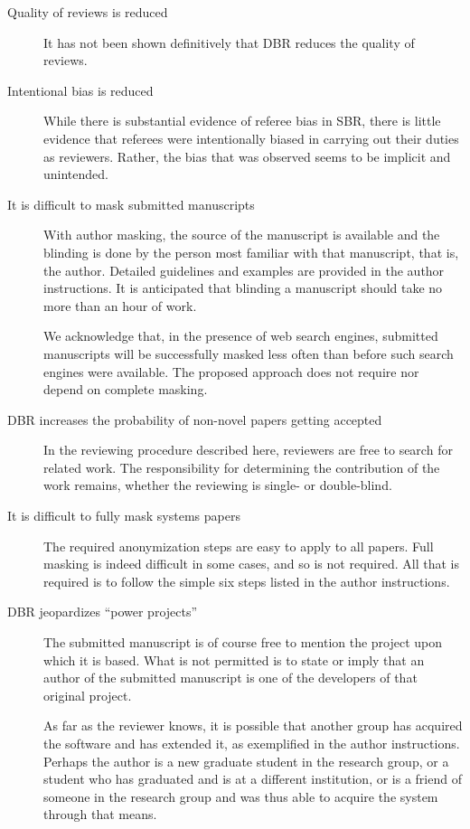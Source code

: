 \documentclass[acmtods,acmnow]{acmtrans2m}
\begin{document}
\begin{description}
\item[Quality of reviews is reduced] It has not been shown definitively that
DBR reduces the quality of reviews.

\item[Intentional bias is reduced] While there is substantial evidence of
referee bias in SBR, there is little evidence that referees were
intentionally biased in carrying out their duties as reviewers. Rather, the
bias that was observed seems to be implicit and unintended.

\item[It is difficult to mask submitted manuscripts]
With author masking, the source of the manuscript is available and the
blinding is done by the person most familiar with that manuscript, that is, the
author. Detailed guidelines and examples are provided in the author
instructions. It is anticipated that blinding a manuscript should take no
more than an hour of work.

We acknowledge that, in the presence of web search engines, submitted
manuscripts will be successfully masked less often than before such search
engines were available. The proposed approach does not require nor depend
on complete masking.

\item[DBR increases the probability of non-novel papers getting accepted]
In the reviewing procedure described here, reviewers are free to search for
related work. The responsibility for determining the contribution of the
work remains, whether the reviewing is single- or double-blind.

\item[It is difficult to fully mask systems papers]
The required anonymization steps are easy to apply to all papers. Full
masking is indeed difficult in some cases, and so is not required. All that
is required is to follow the simple six steps listed in the author instructions.

\item[DBR jeopardizes ``power projects'']
The submitted manuscript is of course free to mention the project upon which
it is based. What is not permitted is to state or imply that an author of
the submitted manuscript is one of the developers of that original
project.

As far as the reviewer knows, it is possible that another group has acquired the
software and has extended it, as exemplified in the author instructions.
Perhaps the author is a new graduate student in the research group,
or a student who has graduated and is at a different institution, or is a
friend of someone in the research group and was thus able to acquire the
system through that means.


\end{description}
\end{document}
